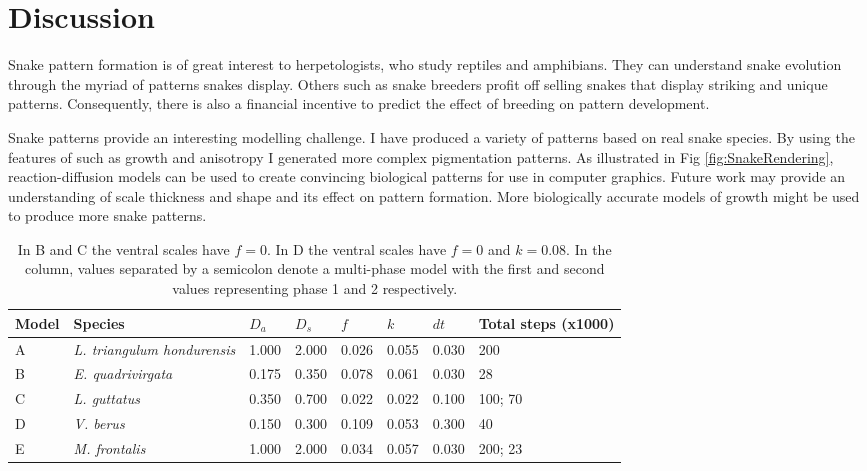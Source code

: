 \newpage

\section{Discussion}
Snake pattern formation is of great interest to herpetologists, who study reptiles and amphibians. They can understand snake evolution through the myriad of patterns snakes display. Others such as snake breeders profit off selling snakes that display striking and unique patterns. Consequently, there is also a financial incentive to predict the effect of breeding on pattern development. 

Snake patterns provide an interesting modelling challenge. I have produced a variety of patterns based on real snake species. By using the features of \ProgramName{} such as growth and anisotropy I generated more complex pigmentation patterns. As illustrated in Fig \ref{fig:SnakeRendering}, reaction-diffusion models can be used to create convincing biological patterns for use in computer graphics. Future work may provide an understanding of scale thickness and shape and its effect on pattern formation. More biologically accurate models of growth might be used to produce more snake patterns.

\begin{table}[h]
	\centering
	\begin{tabular}{|l|l|l|l|l|l|l|l|}
	\hline
	Model & Species                      &$D_a$ &$D_s$ &$f$    &$k$   &$dt$ &Total steps (x1000)\\ \hline 
	A     &\textit{L. triangulum hondurensis} &1.000 &2.000 &0.026 &0.055 &0.030 &200                \\ \hline
	B     &\textit{E. quadrivirgata}     &0.175 &0.350 &0.078 &0.061 &0.030 &28                 \\ \hline
	C     &\textit{L. guttatus}          &0.350 &0.700 &0.022 &0.022 &0.100 &100; 70            \\ \hline
	D     &\textit{V. berus}             &0.150 &0.300 &0.109 &0.053 &0.300 &40                 \\ \hline
	E     &\textit{M. frontalis}         &1.000 &2.000 &0.034 &0.057 &0.030 &200; 23            \\ \hline
	\end{tabular}
	\caption {In B and C the ventral scales have $f=0$. In D the ventral scales have $f=0$ and $k=0.08$. In the  column, values separated by a semicolon denote a multi-phase model with the first and second values representing phase 1 and 2 respectively.}
	\label{tab:gsSnakeParameters}
\end{table}

